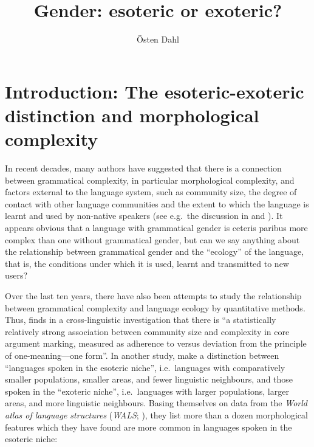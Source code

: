 \documentclass[output=collectionpaper]{langsci/langscibook}
\title{Gender: esoteric or exoteric?}
\author{Östen Dahl\affiliation{Stockholm University}}%
\begin{document}
\maketitle

\section{Introduction: The esoteric-exoteric distinction and morphological complexity}
\largerpage
In recent decades, many authors have suggested that there is a connection between grammatical complexity, in particular morphological complexity, and factors external to the language system, such as community size, the degree of contact with other language communities and the extent to which the language is learnt and used by non-native speakers (see e.g.\ the discussion in \citealt{Trudgill1983} and \citealt{Dahl2004}). It appears obvious that a language with grammatical gender is ceteris paribus more complex than one without grammatical gender, but can we say anything about the relationship between grammatical gender and the ``ecology'' of the language, that is, the conditions under which it is used, learnt and transmitted to new users?

 
 Over the last ten years, there have also been attempts to study the relationship between grammatical complexity and language ecology by quantitative methods. Thus, \citet[138]{Sinnemaeki2009} finds in a cross-linguistic investigation that there is ``a statistically relatively strong association between community size and complexity in core argument marking, measured as adherence to versus deviation from the principle of one-meaning—one form''. In another study, \citet{Lupyan2010} make a distinction between ``languages spoken in the esoteric niche'', i.e.\ languages with comparatively smaller populations, smaller areas, and fewer linguistic neighbours, and those spoken in the ``exoteric niche'', i.e.\ languages with larger populations, larger areas, and more linguistic neighbours. Basing themselves on data from the \textit{World atlas of language structures} (\textit{WALS}; \citealt{Dryer2013}), they list more than a dozen morphological features which they have found are more common in languages spoken in the esoteric niche:
\end{document}
